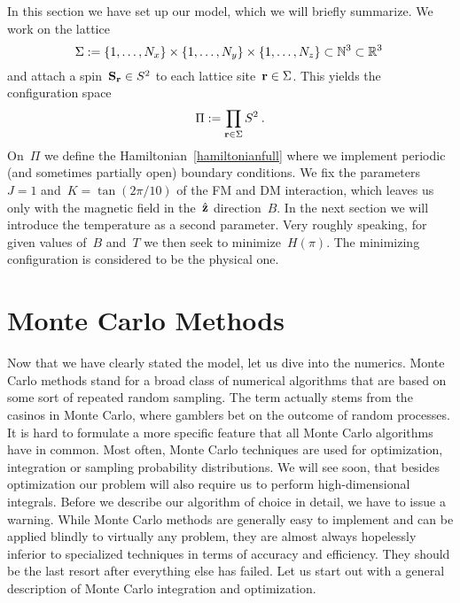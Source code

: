 In this section we have set up our model, which we will briefly summarize. We
work on the lattice
%
\begin{equation}
  \Sigma := \{1,\dots,N_x\} \times \{1,\dots,N_y\} \times
  \{1,\dots,N_z\} \subset \mathbb{N}^3 \subset \mathbb{R}^3\:
\end{equation}
%
and attach a spin~$\mathbf{S}_{\mathbf{r}} \in S^2$ to each lattice site~$\mathbf{r} \in \Sigma$. This
yields the configuration space
%
\begin{equation}
  \Pi := \prod_{\mathbf{r} \in \Sigma} S^2\:.
\end{equation}
%
On~$\Pi$ we define the Hamiltonian~\eqref{hamiltonianfull} where we implement
periodic (and sometimes partially open) boundary conditions. We fix the
parameters~$J=1$ and~$K=\tan(2\pi / 10)$ of the FM and DM interaction, which
leaves us only with the magnetic field in the~$\hat{\mathbf{z}}$ direction~$B$. In the next
section we will introduce the temperature as a second parameter. Very roughly
speaking, for given values of~$B$ and~$T$ we then seek to minimize~$H(\pi)$. The
minimizing configuration is considered to be the physical one.
%
\section{Monte Carlo Methods}\label{sec:mctheory}
%
Now that we have clearly stated the model, let us dive into the numerics. Monte
Carlo methods stand for a broad class of numerical algorithms that are based on
some sort of repeated random sampling. The term actually stems from the casinos
in Monte Carlo, where gamblers bet on the outcome of random processes. It is
hard to formulate a more specific feature that all Monte Carlo algorithms have
in common. Most often, Monte Carlo techniques are used for optimization,
integration or sampling probability distributions. We will see soon, that
besides optimization our problem will also require us to perform
high-dimensional integrals. Before we describe our algorithm of choice in
detail, we have to issue a warning. While Monte Carlo methods are generally easy
to implement and can be applied blindly to virtually any problem, they are
almost always hopelessly inferior to specialized techniques in terms of accuracy
and efficiency. They should be the last resort after everything else has failed.
Let us start out with a general description of Monte Carlo integration and
optimization.

